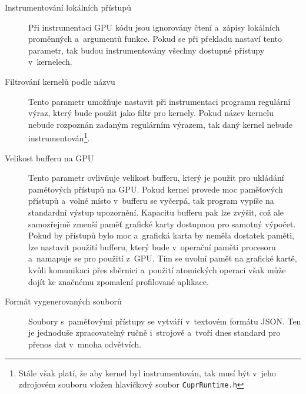 \begin{description}
    \item[Instrumentování lokálních přístupů] Při instrumentaci GPU kódu jsou ignorovány čtení a~zápisy lokálních proměnných a~argumentů funkce. Pokud se při překladu nastaví tento parametr, tak budou instrumentovány všechny dostupné přístupy v~kernelech.
    \item[Filtrování kernelů podle názvu] Tento parametr umožňuje nastavit při instrumentaci programu regulární výraz, který bude použit jako filtr pro kernely. Pokud název kernelu \mbox{nebude} rozpoznán zadaným regulárním výrazem, tak daný kernel nebude instrumentován\footnote{Stále však platí, že aby kernel byl instrumentován, tak musí být v~jeho zdrojovém souboru vložen hlavičkový soubor \texttt{CuprRuntime.h}}.
    \item[Velikost bufferu na GPU] Tento parametr ovlivňuje velikost bufferu, který je použit pro ukládání paměťových přístupů na GPU. Pokud kernel provede moc paměťových přístupů a~volné místo v~bufferu se vyčerpá, tak program vypíše na standardní výstup upozornění. Kapacitu bufferu pak lze zvýšit, což ale samozřejmě zmenší paměť grafické karty dostupnou pro samotný výpočet. Pokud by přístupů bylo moc a~grafická karta by neměla dostatek paměti, lze nastavit použití bufferu, který bude v~operační paměti procesoru a~namapuje se pro použití z~GPU. Tím se uvolní paměť na grafické kartě, kvůli komunikaci přes sběrnici a~použití atomických operací však může dojít ke značnému zpomalení profilované aplikace.
    \item[Formát vygenerovaných souborů] Soubory s~paměťovými přístupy se vytváří v~textovém formátu JSON. Ten je jednoduše zpracovatelný ručně i~strojově a~tvoří dnes standard pro přenos dat v~mnoha odvětvích.

\end{description}
